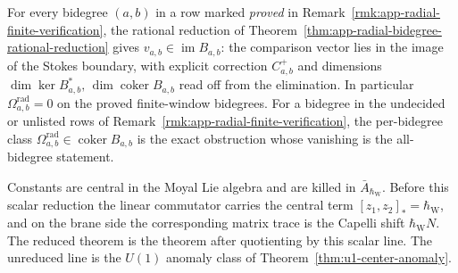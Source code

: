 \begin{cor}\label{cor:app-radial-vanishing-on-listed-range}
  For every bidegree \((a,b)\) in a row marked \emph{proved} in
  Remark~\ref{rmk:app-radial-finite-verification},
  the rational reduction of
  Theorem~\ref{thm:app-radial-bidegree-rational-reduction} gives
  \(v_{a,b}\in\operatorname{im}B_{a,b}\): the comparison vector lies in
  the image of the Stokes boundary, with explicit correction
  \(C^+_{a,b}\) and dimensions
  \(\dim\ker B_{a,b}^*,\,\dim\operatorname{coker}B_{a,b}\) read off from
  the elimination.  In particular
  \(\Omega^{\mathrm{rad}}_{a,b}=0\) on the proved finite-window
  bidegrees.  For a bidegree in the undecided or unlisted rows of
  Remark~\ref{rmk:app-radial-finite-verification}, the per-bidegree class
  \(\Omega^{\mathrm{rad}}_{a,b}\in\operatorname{coker}B_{a,b}\) is the
  exact obstruction whose vanishing is the all-bidegree statement.
\end{cor}

\begin{rmk}
\label{rmk:app-radial-scalar-quotient}
  Constants are central in the Moyal Lie algebra and are killed in
  \(\bar A_{\hbar_{\mathrm{W}}}\).  Before this scalar reduction the linear
  commutator carries the central term
  \([z_1,z_2]_*= \hbar_{\mathrm{W}}\), and on the brane side the corresponding
  matrix trace is the Capelli shift \(\hbar_{\mathrm{W}} N\).  The reduced theorem
  is the theorem after quotienting by this scalar line.
  The unreduced line is the \(U(1)\) anomaly class of
  Theorem~\ref{thm:u1-center-anomaly}.
\end{rmk}

